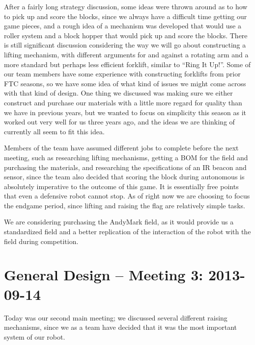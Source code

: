 \documentclass{article}
\begin{document}
After a fairly long strategy discussion, some ideas were thrown around as to how to pick up and score the blocks, since we always have a difficult time getting our game pieces, and a rough idea of a mechanism was developed that would use a roller system and a block hopper that would pick up and score the blocks. There is still significant discussion considering the way we will go about constructing a lifting mechanism, with different arguments for and against a rotating arm and a more standard but perhaps less efficient forklift, similar to ``Ring It Up!''. Some of our team members have some experience with constructing forklifts from prior FTC seasons, so we have some idea of what kind of issues we might come across with that kind of design. One thing we discussed was making sure we either construct and purchase our materials with a little more regard for quality than we have in previous years, but we wanted to focus on simplicity this season as it worked out very well for us three years ago, and the ideas we are thinking of currently all seem to fit this idea.

Members of the team have assumed different jobs to complete before the next meeting, such as researching lifting mechanisms, getting a BOM for the field and purchasing the materials, and researching the specifications of an IR beacon and sensor, since the team also decided that scoring the block during autonomous is absolutely imperative to the outcome of this game. It is essentially free points that even a defensive robot cannot stop. As of right now we are choosing to focus the endgame period, since lifting and raising the flag are relatively simple tasks. 

We are considering purchasing the AndyMark field, as it would provide us a standardized field and a better replication of the interaction of the robot with the field during competition. 

\newpage
\section{General Design -- Meeting 3: 2013-09-14}
Today was our second main meeting; we discussed several different raising mechanisms, since we as a team have decided that it was the most important system of our robot.
\end{document}
